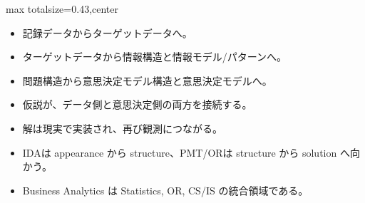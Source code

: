 \clearpage
{}
\begin{minipage}[t]{0.405\textwidth}
\begin{adjustbox}{max totalsize={\textwidth}{0.43\textheight},center}
\begin{minipage}{\textwidth}\scriptsize
{}\begin{itemize}
\item 記録データからターゲットデータへ。
\item ターゲットデータから情報構造と情報モデル/パターンへ。
\item 問題構造から意思決定モデル構造と意思決定モデルへ。
\item 仮説が、データ側と意思決定側の両方を接続する。
\item 解は現実で実装され、再び観測につながる。
\end{itemize}\begin{itemize}
\item IDAは appearance から structure、PMT/ORは structure から solution へ向かう。
\item Business Analytics は Statistics, OR, CS/IS の統合領域である。
\end{itemize}
\end{minipage}
\end{adjustbox}
\end{minipage}\hfill
